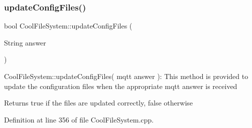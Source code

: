 \subsubsection{\texorpdfstring{update\+Config\+Files()}{updateConfigFiles()}}
{\footnotesize\ttfamily bool Cool\+File\+System\+::update\+Config\+Files (\begin{DoxyParamCaption}\item[{String}]{answer }\end{DoxyParamCaption})}

Cool\+File\+System\+::update\+Config\+Files( mqtt answer )\+: This method is provided to update the configuration files when the appropriate mqtt answer is received

\begin{DoxyReturn}{Returns}
true if the files are updated correctly, false otherwise 
\end{DoxyReturn}


Definition at line 356 of file Cool\+File\+System.\+cpp.


